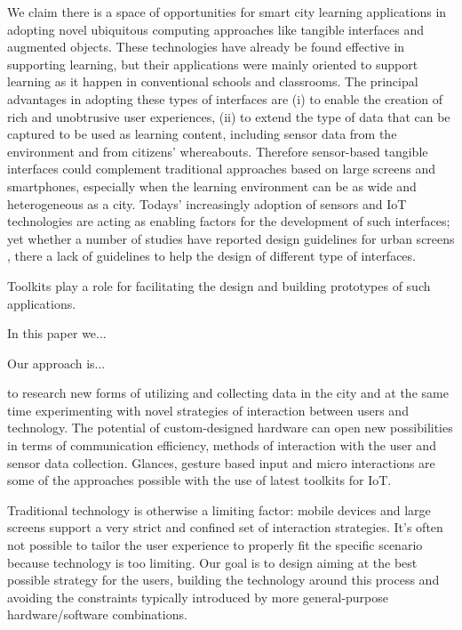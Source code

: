 We claim there is a space of opportunities for smart city learning applications in adopting novel ubiquitous computing approaches like tangible interfaces and augmented objects. These technologies have already be found effective in supporting learning\cite{stanton_classroom_2001}, but their applications were mainly oriented to support learning as it happen in conventional schools and classrooms. The principal advantages in adopting these types of interfaces are (i) to enable the creation of rich and unobtrusive user experiences, (ii) to extend the type of data that can be captured to be used as learning content, including sensor data from the environment and from citizens' whereabouts. Therefore sensor-based tangible interfaces could complement traditional approaches based on large screens and smartphones, especially when the learning environment can be as wide and heterogeneous as a city. Todays' increasingly adoption of sensors and IoT technologies are acting as enabling factors for the development of such interfaces; yet whether a number of studies have reported design guidelines for urban screens \cite{}, there a lack of guidelines to help the design of different type of interfaces.

Toolkits play a role for facilitating the design and building prototypes of such applications.

In this paper we...

Our approach is...



to research new forms of utilizing and collecting data in the city and at the same time experimenting with novel strategies of interaction between users and technology.
The potential of custom-designed hardware can open new possibilities in terms of communication efficiency, methods of interaction with the user and sensor data collection.
Glances, gesture based input and micro interactions are some of the approaches possible with the use of latest toolkits for IoT.

Traditional technology is otherwise a limiting factor: mobile devices and large screens support a very strict and confined set of interaction strategies. It's often not possible to tailor the user experience to properly fit the specific scenario because technology is too limiting.
Our goal is to design aiming at the best possible strategy for the users, building the technology around this process and avoiding the constraints typically introduced by more general-purpose hardware/software combinations.


